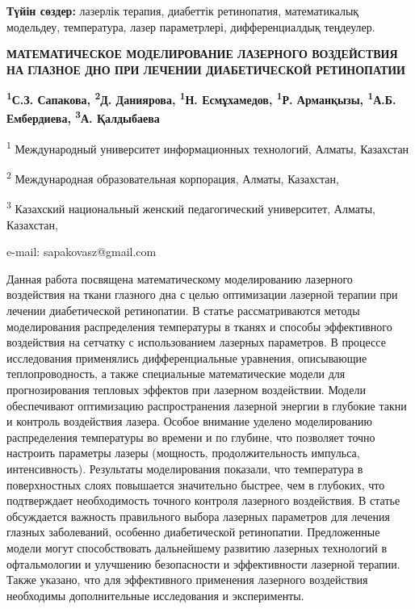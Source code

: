{\bfseries Түйін сөздер:} лазерлік терапия, диабеттік ретинопатия,
математикалық модельдеу, температура, лазер параметрлері,
дифференциалдық теңдеулер.

\begin{articleheader}
{\bfseries МАТЕМАТИЧЕСКОЕ МОДЕЛИРОВАНИЕ ЛАЗЕРНОГО ВОЗДЕЙСТВИЯ НА ГЛАЗНОЕ ДНО ПРИ ЛЕЧЕНИИ ДИАБЕТИЧЕСКОЙ РЕТИНОПАТИИ}

{\bfseries
\textsuperscript{1}С.З. Сапакова\textsuperscript{\envelope },
\textsuperscript{2}Д. Даниярова,
\textsuperscript{1}Н. Есмұхамедов,
\textsuperscript{1}Р. Арманқызы,
\textsuperscript{1}А.Б. Ембердиева,
\textsuperscript{3}А. Қалдыбаева
}
\end{articleheader}

\begin{affiliation}
\textsuperscript{1} Международный университет информационных технологий, Алматы, Казахстан

\textsuperscript{2} Международная образовательная корпорация, Алматы, Казахстан,

\textsuperscript{3} Казахский национальный женский педагогический университет, Алматы, Казахстан,

e-mail: sapakovasz@gmail.com
\end{affiliation}

Данная работа посвящена математическому моделированию лазерного
воздействия на ткани глазного дна с целью оптимизации лазерной терапии
при лечении диабетической ретинопатии. В статье рассматриваются методы
моделирования распределения температуры в тканях и способы эффективного
воздействия на сетчатку с использованием лазерных параметров. В процессе
исследования применялись дифференциальные уравнения, описывающие
теплопроводность, а также специальные математические модели для
прогнозирования тепловых эффектов при лазерном воздействии. Модели
обеспечивают оптимизацию распространения лазерной энергии в глубокие
такни и контроль воздействия лазера. Особое внимание уделено
моделированию распределения температуры во времени и по глубине, что
позволяет точно настроить параметры лазеры (мощность, продолжительность
импульса, интенсивность). Результаты моделирования показали, что
температура в поверхностных слоях повышается значительно быстрее, чем в
глубоких, что подтверждает необходимость точного контроля лазерного
воздействия. В статье обсуждается важность правильного выбора лазерных
параметров для лечения глазных заболеваний, особенно диабетической
ретинопатии. Предложенные модели могут способствовать дальнейшему
развитию лазерных технологий в офтальмологии и улучшению безопасности и
эффективности лазерной терапии. Также указано, что для эффективного
применения лазерного воздействия необходимы дополнительные исследования
и эксперименты.

